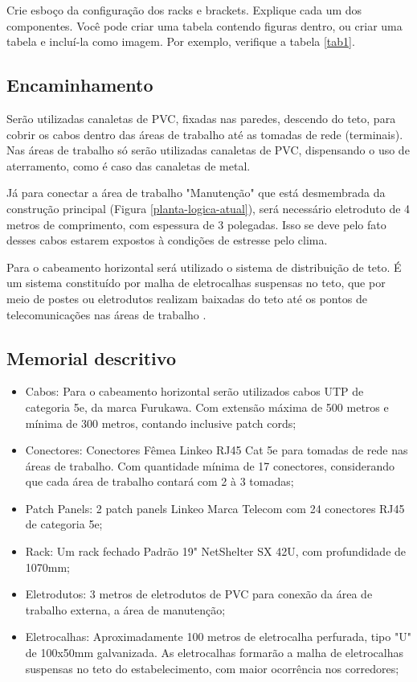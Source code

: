 \documentclass[	DIV=calc,%
							paper=a4,%
							fontsize=12pt,%
							onecolumn]{scrartcl}	 					%
\begin{document}
Crie esboço da configuração dos racks e brackets. Explique cada um dos componentes. Você pode criar uma tabela contendo figuras dentro, ou criar uma tabela e incluí-la como imagem. Por exemplo, verifique a tabela \ref{tab1}.



\subsection{Encaminhamento}

Serão utilizadas canaletas de PVC, fixadas nas paredes, descendo do teto, para cobrir os cabos dentro das áreas de trabalho até as tomadas de rede (terminais). Nas áreas de trabalho só serão utilizadas canaletas de PVC, dispensando o uso de aterramento, como é caso das canaletas de metal.

Já para conectar a área de trabalho "Manutenção" que está desmembrada da construção principal (Figura \ref{planta-logica-atual}), será necessário eletroduto de 4 metros de comprimento, com espessura de 3 polegadas. Isso se deve pelo fato desses cabos estarem expostos à condições de estresse pelo clima.

Para o cabeamento horizontal será utilizado o sistema de distribuição de teto. É um sistema constituído por malha de eletrocalhas suspensas no teto, que por meio de postes ou eletrodutos realizam baixadas do teto até os pontos de telecomunicações nas áreas de trabalho \cite{senai2012}.\newpage


\subsection{Memorial descritivo}

\begin{itemize}
	\item Cabos: Para o cabeamento horizontal serão utilizados cabos UTP de categoria 5e, da marca Furukawa. Com extensão máxima de 500 metros e mínima de 300 metros, contando inclusive patch cords;
	\item Conectores: Conectores Fêmea Linkeo RJ45 Cat 5e para tomadas de rede nas áreas de trabalho. Com quantidade mínima de 17 conectores, considerando que cada área de trabalho contará com 2 à 3 tomadas;
	\item Patch Panels: 2 patch panels Linkeo Marca Telecom com 24 conectores RJ45 de categoria 5e;
	\item Rack: Um rack fechado Padrão 19" NetShelter SX 42U, com  profundidade de 1070mm;
	\item Eletrodutos: 3 metros de eletrodutos de PVC para conexão da área de trabalho externa, a área de manutenção; 
	\item Eletrocalhas: Aproximadamente 100 metros de eletrocalha perfurada, tipo "U" de 100x50mm galvanizada. As eletrocalhas formarão a  malha de eletrocalhas suspensas no teto do estabelecimento, com maior ocorrência nos corredores;
\end{itemize}\newpage
\end{document}
